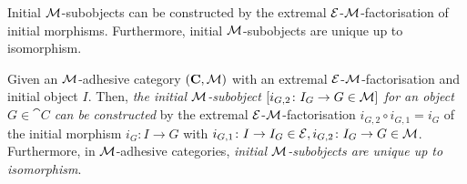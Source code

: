 Initial ${\cal M}$-subobjects can be constructed by the extremal $\mathcal{E}$-${\cal M}$-factorisation of initial morphisms.
Furthermore, initial ${\cal M}$-subobjects are unique up to isomorphism.

\begin{proposition}
\label{prop:sec-compl-software-trans:constr_uniqu_init_msubobj}
Given an ${\cal M}$-adhesive category $(\mathbf{C},{\cal M})$ with an extremal $\mathcal{E}$-${\cal M}$-factorisation and initial object $I$.
Then, \emph{the initial ${\cal M}$-subobject $[i_{G,2}\colon I_G \to G \in {\cal M}]$ for an object $G \in \cat{C}$ can be constructed} by the extremal $\mathcal{E}$-${\cal M}$-factorisation $i_{G,2} \circ i_{G,1}=i_G$ of the initial morphism $i_G\colon I \to G$ with $i_{G,1}\colon I \to I_G \in \mathcal{E},i_{G,2}\colon I_G \to G \in {\cal M}$.
Furthermore, in ${\cal M}$-adhesive categories, \emph{initial ${\cal M}$-subobjects are unique up to isomorphism}.
\envEndMarker
\end{proposition}

